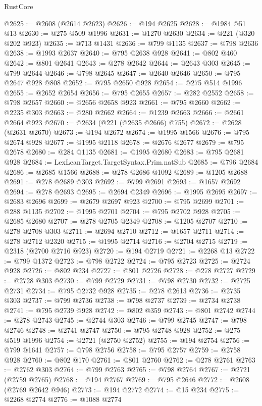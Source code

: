 \begin{lexlean}{RustCore}
\begin{coremodule}
@2625 := @2608 (@2614 @2623)
@2626 := @194 @2625
@2628 := @1984 @51 @13
@2630 := @275 @509 @1996
@2631 := @1270 @2630
@2634 := @221 (@320 @202 @923)
@2635 := @713 @1431
@2636 := @799 @1135
@2637 := @798 @2636
@2638 := @1993 @2637
@2640 := @795 @2638 @928
@2641 := @802 @460
@2642 := @801 @2641
@2643 := @278 @2642
@2644 := @2643 @303
@2645 := @799 @2644
@2646 := @798 @2645
@2647 := @2640 @2646
@2650 := @795 @2647 @928 @808
@2652 := @795 @2650 @928
@2654 := @275 @514 @1996
@2655 := @2652 @2654
@2656 := @795 @2655
@2657 := @282 @2552
@2658 := @798 @2657
@2660 := @2656 @2658 @923
@2661 := @795 @2660
@2662 := @2235 @303
@2663 := @280 @2662
@2664 := @1239 @2663
@2666 := @2661 @2664 @923
@2670 := @2634 (@221 (@2635 @2666) @755)
@2672 := @2628 (@2631 @2670)
@2673 := @194 @2672
@2674 := @1995 @1566
@2676 := @795 @2674 @928
@2677 := @1995 @2118
@2678 := @2676 @2677
@2679 := @795 @2678
@2680 := @284 @1135
@2681 := @1995 @2680
@2683 := @795 @2681 @928
@2684 := LexLeanTarget.TargetSyntax.Prim.natSub
@2685 := @796 @2684
@2686 := @2685 @1566
@2688 := @278 @2686 @1092
@2689 := @1205 @2688
@2691 := @278 @2689 @303
@2692 := @799 @2691
@2693 := @1657 @2692
@2694 := @278 @2693
@2695 := @2694 @2349
@2696 := @1995 @2695
@2697 := @2683 @2696
@2699 := @2679 @2697 @923
@2700 := @795 @2699
@2701 := @288 @1135
@2702 := @1995 @2701
@2704 := @795 @2702 @928
@2705 := @2685 @2680
@2707 := @278 @2705 @2349
@2708 := @1205 @2707
@2710 := @278 @2708 @303
@2711 := @2694 @2710
@2712 := @1657 @2711
@2714 := @278 @2712 @2320
@2715 := @1995 @2714
@2716 := @2704 @2715
@2719 := @2318 (@2700 @2716 @923)
@2720 := @194 @2719
@2721 := @2268 @13
@2722 := @799 @1372
@2723 := @798 @2722
@2724 := @795 @2723
@2725 := @2724 @928
@2726 := @802 @234
@2727 := @801 @2726
@2728 := @278 @2727
@2729 := @2728 @303
@2730 := @799 @2729
@2731 := @798 @2730
@2732 := @2725 @2731
@2734 := @795 @2732 @928
@2735 := @278 @2613
@2736 := @2735 @303
@2737 := @799 @2736
@2738 := @798 @2737
@2739 := @2734 @2738
@2741 := @795 @2739 @928
@2742 := @802 @359
@2743 := @801 @2742
@2744 := @278 @2743
@2745 := @2744 @303
@2746 := @799 @2745
@2747 := @798 @2746
@2748 := @2741 @2747
@2750 := @795 @2748 @928
@2752 := @275 @519 @1996
@2754 := @2721 (@2750 @2752)
@2755 := @194 @2754
@2756 := @799 @1641
@2757 := @798 @2756
@2758 := @795 @2757
@2759 := @2758 @928
@2760 := @802 @170
@2761 := @801 @2760
@2762 := @278 @2761
@2763 := @2762 @303
@2764 := @799 @2763
@2765 := @798 @2764
@2767 := @2721 (@2759 @2765)
@2768 := @194 @2767
@2769 := @795 @2646
@2772 := @2608 (@2769 @2642 @946)
@2773 := @194 @2772
@2774 := @15 @234
@2775 := @2268 @2774
@2776 := @1088 @2774

\end{coremodule}
\end{lexlean}
